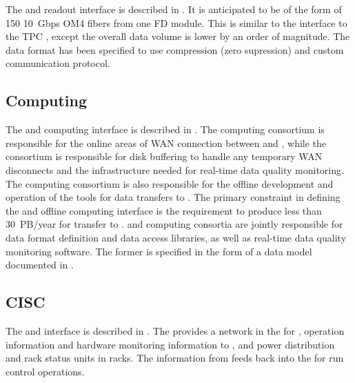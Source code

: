 The  and  readout interface is described in
. It is anticipated to
be of the form of 150  \SI{10}{Gbps} OM4 fibers from one FD module. 
This
is similar to the interface to the TPC , except the overall
data volume is lower by an order of magnitude. The data format has been specified to use
compression (zero supression) and custom communication protocol.

\subsection{Computing}

The  and computing interface is described in .
 The computing consortium %
 is responsible for the online areas of WAN connection between \surf and
\fnal, while the  consortium is responsible for disk buffering
to handle any temporary WAN disconnects and the infrastructure needed
for real-time data quality monitoring.  The computing consortium 
is also
responsible for the offline development and operation of the tools for data
transfers to \fnal. The primary
constraint in defining the  and offline computing interface is the
requirement to produce less than \SI{30}{PB/year} %
for transfer to
\fnal.  and %
computing consortia are jointly responsible for data
format definition and data access libraries, as well as real-time data
quality monitoring software. The former is specified in the form of a 
data model documented in .

\subsection{CISC}

\label{sec:sp-daq:interfaces-cisc}
The  and  interface is described in
. The  provides a network in the  for ,  operation information and hardware
monitoring information to , and power distribution and
rack status units in  racks. The information from 
feeds back into the  for run control operations.

